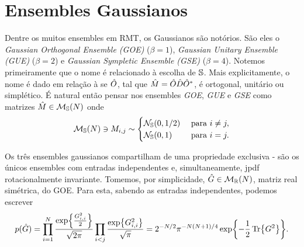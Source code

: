\section{Ensembles Gaussianos}
\label{Section: Ensembles Gaussianos}

Dentre os muitos ensembles em RMT, os Gaussianos são notórios. São eles o \textit{Gaussian Orthogonal Ensemble (GOE)} ($\beta=1$), \textit{Gaussian Unitary Ensemble (GUE)} ($\beta=2$) e \textit{Gaussian Sympletic Ensemble (GSE)} ($\beta=4$). Notemos primeiramente que o nome é relacionado à escolha de $\mathbb{S}$. Mais explicitamente, o nome é dado em relação à se $\hat O$, tal que $\hat M = \hat O\hat D\hat O^*$, é ortogonal, unitário ou simplético. É natural então pensar nos ensembles \textit{GOE}, \textit{GUE} e \textit{GSE} como matrizes $\hat M \in \mathcal{M}_{\mathbb{S}}(N)$ onde 
$$
\mathcal{M}_{\mathbb{S}}(N) \ni M_{i,j} \sim
\begin{cases}
	\mathcal{N}_{\mathbb{S}}(0,1/2) &  \ \text{para} \ i \neq j,\\
	\mathcal{N}_{\mathbb{S}}(0,1) & \ \text{para} \ i = j.
\end{cases}
$$

Os três ensembles gaussianos compartilham de uma propriedade exclusiva - são os únicos ensembles com entradas independentes e, simultaneamente, jpdf rotacionalmente invariante. Tomemos, por simplicidade, $\hat G \in \mathcal{M}_{\mathbb{R}}(N)$, matriz real simétrica, do GOE. Para esta, sabendo as entradas independentes, podemos escrever $$p(\hat G) = \prod_{i=1}^{N}\frac{\exp{\frac{G_{i,i}^2}{2}}}{\sqrt{2\pi}} \prod_{i<j} \frac{\exp{G_{i,i}^2}}{\sqrt{\pi}} = 2^{-N/2} \pi^{-N(N + 1)/4} \exp{-\frac{1}{2} \Tr{G^2}}.$$

